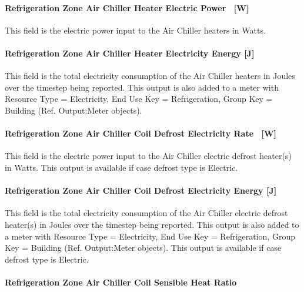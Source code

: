 \paragraph{Refrigeration Zone Air Chiller Heater Electric Power~ {[}W{]}}\label{refrigeration-zone-air-chiller-heater-electric-power-w}

This field is the electric power input to the Air Chiller heaters in Watts.

\paragraph{Refrigeration Zone Air Chiller Heater Electricity Energy {[}J{]}}\label{refrigeration-zone-air-chiller-heater-electric-energy-j}

This field is the total electricity consumption of the Air Chiller heaters in Joules over the timestep being reported. This output is also added to a meter with Resource Type = Electricity, End Use Key = Refrigeration, Group Key = Building (Ref. Output:Meter objects).

\paragraph{Refrigeration Zone Air Chiller Coil Defrost Electricity Rate~ {[}W{]}}\label{refrigeration-zone-air-chiller-coil-defrost-electric-power-w}

This field is the electric power input to the Air Chiller electric defrost heater(s) in Watts. This output is available if case defrost type is Electric.

\paragraph{Refrigeration Zone Air Chiller Coil Defrost Electricity Energy {[}J{]}}\label{refrigeration-zone-air-chiller-coil-defrost-electric-energy-j}

This field is the total electricity consumption of the Air Chiller electric defrost heater(s) in Joules over the timestep being reported. This output is also added to a meter with Resource Type = Electricity, End Use Key = Refrigeration, Group Key = Building (Ref. Output:Meter objects). This output is available if case defrost type is Electric.

\paragraph{Refrigeration Zone Air Chiller Coil Sensible Heat Ratio}\label{refrigeration-zone-air-chiller-coil-sensible-heat-ratio}

